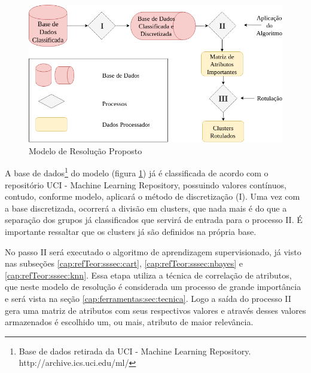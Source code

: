 \begin{figure}[h!]
        \centering
        \includegraphics[scale=0.6]{figs/modeloResolucao.png}
        \caption{Modelo de Resolução Proposto} \label{fig:modeloresolucao}
\end{figure}

A base de dados\footnote{Base de dados retirada da UCI - Machine Learning Repository. http://archive.ics.uci.edu/ml/} do modelo (figura \ref{fig:modeloresolucao}) já é classificada de acordo com o repositório UCI - Machine Learning Repository, possuindo valores contínuos, contudo, conforme modelo, aplicará o método de discretização (I). Uma vez com a base discretizada, ocorrerá a divisão em clusters, que nada mais é do que a separação dos grupos já classificados que servirá de entrada para o processo II. É importante ressaltar que  os clusters já são definidos na própria base. 

No passo II será executado o algoritmo de aprendizagem supervisionado, já visto nas subseções \ref{cap:refTeor:sssec:cart}, \ref{cap:refTeor:sssec:nbayes} e \ref{cap:refTeor:sssec:knn}. Essa etapa utiliza a técnica de correlação de atributos, que neste modelo de resolução é considerada um processo de grande importância e será vista na seção   \ref{cap:ferramentas:sec:tecnica}. Logo a saída do processo II gera uma matriz de atributos com seus respectivos valores e através desses valores armazenados é escolhido um, ou mais, atributo de maior relevância. 



